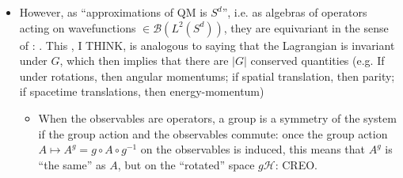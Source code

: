 \documentclass{article}
\begin{document}
\begin{itemize}
    \item However, as ``approximations of QM is $S^d$'', i.e. as algebras of operators acting on wavefunctions $\in \mathcal B(L^2(S^d))$, they are equivariant in the sense of : .
    \tiny{This , I THINK, is analogous to saying that the Lagrangian is invariant under $G$, which then implies that there are $|G|$ conserved quantities (e.g. If under rotations, then angular momentums; if spatial translation, then parity; if spacetime translations, then energy-momentum)}
    
        \begin{itemize}
            
        
        
        \item When the observables are operators, a group is a symmetry of the system if the group action and the observables commute: once the group action $A \mapsto A^g = g \circ A \circ g^{-1}$ on the observables is induced, this means that $A^g$ is ``the same'' as $A$, but on the ``rotated'' space $g\mathcal H$:  CREO.
            
        \end{itemize}
    
    \end{itemize}

\end{document}
